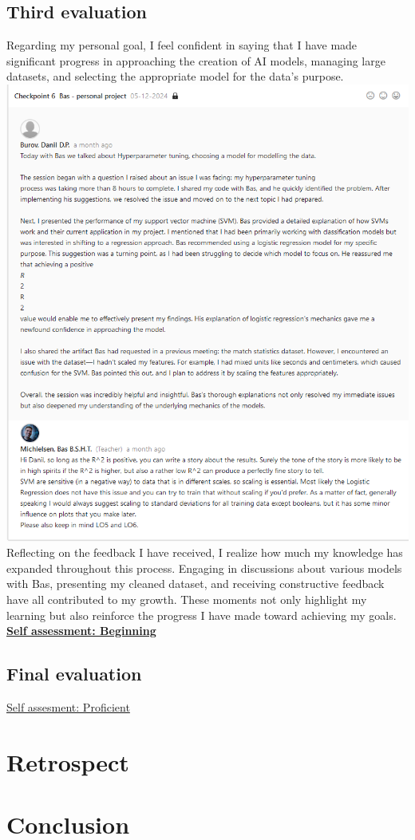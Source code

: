 \documentclass{article}
\begin{document}
\subsection{Third evaluation}
Regarding my personal goal, I feel confident in saying that I have made significant progress in approaching the creation of AI models, managing large datasets, and selecting the appropriate model for the data's purpose.\\
\includegraphics[width=\textwidth,keepaspectratio]{images/Feedback_Bas_2.png}\\
Reflecting on the feedback I have received, I realize how much my knowledge has expanded throughout this process. Engaging in discussions about various models with Bas, presenting my cleaned dataset, and receiving constructive feedback have all contributed to my growth. These moments not only highlight my learning but also reinforce the progress I have made toward achieving my goals.\\
  \underline{\textbf{Self assessment: Beginning}}
\subsection{Final evaluation}
\underline{Self assesment: Proficient}

\section{Retrospect} %

\section{Conclusion} %
\end{document}
